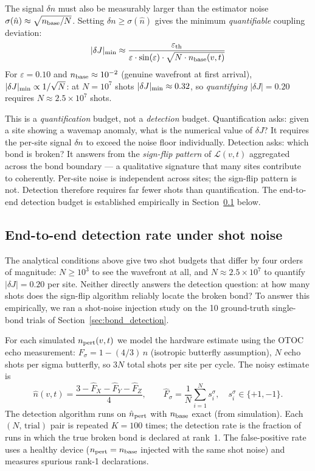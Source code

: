 \documentclass[11pt]{article}
\begin{document}
The signal $\delta n$ must also be measurably larger than the estimator
noise $\sigma(\hat{n}) \approx \sqrt{n_{\rm base}/N}$. Setting $\delta n \geq
\sigma(\hat{n})$ gives the minimum \emph{quantifiable} coupling deviation:
\begin{equation}
    |\delta J|_{\rm min} \approx \frac{\varepsilon_{\rm th}}
        {\varepsilon \cdot \sin(\varepsilon) \cdot \sqrt{N \cdot n_{\rm base}(v,t)}}
\end{equation}
For $\varepsilon = 0.10$ and $n_{\rm base} \approx 10^{-2}$ (genuine wavefront
at first arrival), $|\delta J|_{\rm min} \propto 1/\sqrt{N}$: at $N=10^7$
shots $|\delta J|_{\rm min} \approx 0.32$, so \emph{quantifying}
$|\delta J| = 0.20$ requires $N \approx 2.5 \times 10^7$ shots.

This is a \emph{quantification} budget, not a \emph{detection} budget.
Quantification asks: given a site showing a wavemap anomaly, what is the
numerical value of $\delta J$? It requires the per-site signal $\delta n$
to exceed the noise floor individually.
Detection asks: which bond is broken? It answers from the
\emph{sign-flip pattern} of $\mathcal{L}(v,t)$ aggregated across the
bond boundary — a qualitative signature that many sites contribute to
coherently. Per-site noise is independent across sites; the sign-flip
pattern is not.
Detection therefore requires far fewer shots than quantification.
The end-to-end detection budget is established empirically in
Section~\ref{sec:shot_detect} below.

\subsection{End-to-end detection rate under shot noise}
\label{sec:shot_detect}

The analytical conditions above give two shot budgets that differ by
four orders of magnitude: $N \geq 10^3$ to see the wavefront at all,
and $N \approx 2.5\times10^7$ to quantify $|\delta J|=0.20$ per site.
Neither directly answers the detection question: at how many shots does
the sign-flip algorithm reliably locate the broken bond?
To answer this empirically, we ran a shot-noise injection study on the
10 ground-truth single-bond trials of Section~\ref{sec:bond_detection}.

For each simulated $n_{\rm pert}(v,t)$ we model the hardware estimate
using the OTOC echo measurement: $F_\sigma = 1 - (4/3)\,n$ (isotropic
butterfly assumption), $N$ echo shots per sigma butterfly, so $3N$
total shots per site per cycle. The noisy estimate is
\begin{equation}
    \hat{n}(v,t) = \frac{3 - \hat{F}_X - \hat{F}_Y - \hat{F}_Z}{4}, \qquad
    \hat{F}_\sigma = \frac{1}{N}\sum_{i=1}^{N} s_i^\sigma, \quad s_i^\sigma \in \{+1,-1\}.
\end{equation}
The detection algorithm runs on $\hat{n}_{\rm pert}$ with $n_{\rm base}$
exact (from simulation). Each $(N,\,\text{trial})$ pair is repeated
$K=100$ times; the detection rate is the fraction of runs in which
the true broken bond is declared at rank~1.
The false-positive rate uses a healthy device ($n_{\rm pert} = n_{\rm base}$
injected with the same shot noise) and measures spurious rank-1 declarations.
\end{document}
